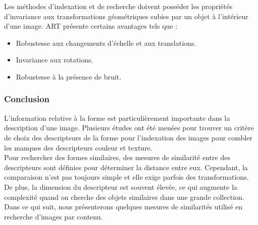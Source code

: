 Les méthodes d’indexation et de recherche doivent posséder les propriétés d’invariance aux
transformations géométriques subies par un objet à l’intérieur d’une image. ART présente certains avantages tels que :
\begin{itemize}
	\item  Robustesse aux changements d’échelle et aux translations.
	\item Invariance aux rotations.
	\item  Robustesse à la présence de bruit.
\end{itemize}

\subsubsection{Conclusion}
L'information relative à la forme est particulièrement importante dans la description d'une image. Plusieurs études ont été menées pour trouver un critère de choix des descripteurs de la forme pour l'indexation des images pour combler les manques des descripteurs couleur et texture.\\

Pour rechercher des formes similaires, des mesures de similarité entre des descripteurs sont définies pour déterminer la distance entre eux. Cependant, la comparaison n’est pas toujours simple et elle exige parfois des transformations. De plus, la dimension du descripteur est souvent élevée, ce qui augmente la complexité quand on cherche des objets similaires dans une grande collection.\\

Dans ce qui suit, nous présenterons quelques mesures de similarités utilisé en recherche d'images par contenu.

%
% 
%   
%
%


